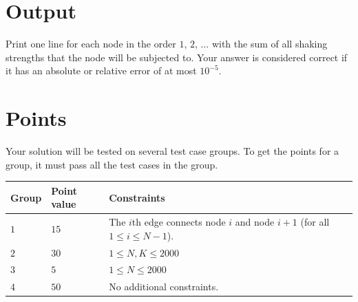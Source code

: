 \section*{Output}
Print one line for each node in the order $1$, $2$, $\dots$ with the sum of all shaking strengths that the node will be subjected to.
Your answer is considered correct if it has an absolute or relative error of at most $10^{-5}$.

\section*{Points}
Your solution will be tested on several test case groups.
To get the points for a group, it must pass all the test cases in the group.

\noindent
\begin{tabular}{| l | l | p{12cm} |}
  \hline
  \textbf{Group} & \textbf{Point value} & \textbf{Constraints} \\ \hline
  $1$    & $15$       &  The $i$th edge connects node $i$ and node $i+1$ (for all $1 \le i \le N-1$). \\ \hline 
  $2$    & $30$       &  $1 \le N,K \le 2000$ \\ \hline
  $3$    & $5$        &  $1 \le N \le 2000$ \\ \hline
  $4$    & $50$        &  No additional constraints. \\ \hline
\end{tabular}

